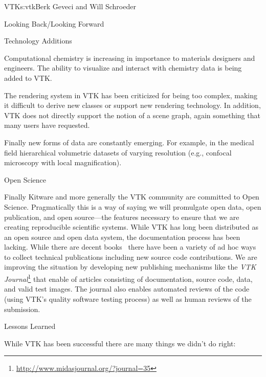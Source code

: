 \begin{aosachapter}{VTK}{s:vtk}{Berk Geveci and Will Schroeder}
\begin{aosasect1}{Looking Back/Looking Forward}
\begin{aosasect2}{Technology Additions}
\begin{aosaitemize}
  \item Computational chemistry is increasing in importance to materials
  designers and engineers. The ability to visualize and interact with
  chemistry data is being added to VTK.

  \item The rendering system in VTK has been criticized for being too
  complex, making it difficult to derive new classes or support new
  rendering technology. In addition, VTK does not directly support the
  notion of a scene graph, again something that many users have
  requested.

  \item Finally new forms of data are constantly emerging. For example,
  in the medical field hierarchical volumetric datasets of varying
  resolution (e.g., confocal microscopy with local magnification).

\end{aosaitemize}

\end{aosasect2}

\begin{aosasect2}{Open Science}

Finally Kitware and more generally the VTK community are committed to
Open Science. Pragmatically this is a way of saying we will promulgate
open data, open publication, and open source---the features necessary
to ensure that we are creating reproducible scientific systems. While
VTK has long been distributed as an open source and open data system,
the documentation process has been lacking. While there are decent
books~\cite{bib:vtk:userguide,bib:vtk:toolkit} there
have been a variety of ad hoc ways to collect technical publications
including new source code contributions. We are improving the
situation by developing new publishing mechanisms like the \emph{VTK
Journal}\footnote{\url{http://www.midasjournal.org/?journal=35}}
that enable of articles consisting of documentation, source code,
data, and valid test images. The journal also enables automated
reviews of the code (using VTK's quality software testing process) as
well as human reviews of the submission.

\end{aosasect2}

\begin{aosasect2}{Lessons Learned}

While VTK has been successful there are many things we didn't do
right:

\begin{aosadescription}


\end{aosadescription}
\end{aosasect2}
\end{aosasect1}
\end{aosachapter}
